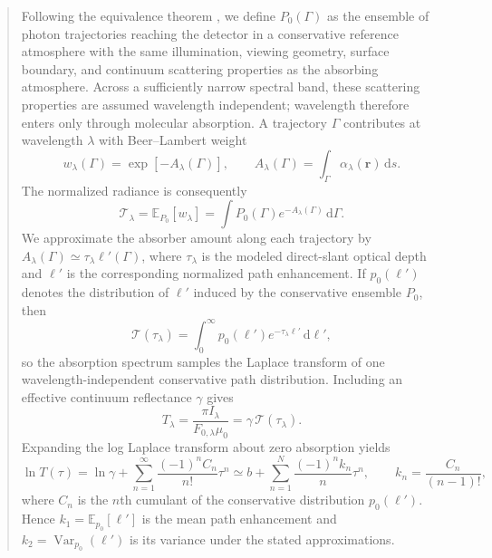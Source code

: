 \documentclass[11pt]{article}
\newcommand{\dd}{\,\mathrm{d}}
\newcommand{\E}{\mathbb{E}}
\newcommand{\Var}{\operatorname{Var}}
\newcommand{\lp}{\ell'}
\begin{document}
\begin{quote}
Following the equivalence theorem \citep{irvine1964,partain2000,stephens2000},
we define $P_0(\Gamma)$ as the ensemble of photon trajectories reaching the
detector in a conservative reference atmosphere with the same illumination,
viewing geometry, surface boundary, and continuum scattering properties as the
absorbing atmosphere.  Across a sufficiently narrow spectral band, these
scattering properties are assumed wavelength independent; wavelength therefore
enters only through molecular absorption.  A trajectory $\Gamma$ contributes
at wavelength $\lambda$ with Beer--Lambert weight
\begin{equation}
  w_\lambda(\Gamma)
  = \exp[-A_\lambda(\Gamma)],
  \qquad
  A_\lambda(\Gamma)
  = \int_\Gamma \alpha_\lambda(\bm r)\dd s.
  \label{eq:ms_weight}
\end{equation}
The normalized radiance is consequently
\begin{equation}
  \mathcal T_\lambda
  = \E_{P_0}[w_\lambda]
  = \int P_0(\Gamma)e^{-A_\lambda(\Gamma)}\dd\Gamma.
  \label{eq:ms_equivalence}
\end{equation}
We approximate the absorber amount along each trajectory by
$A_\lambda(\Gamma)\simeq\tau_\lambda\lp(\Gamma)$, where $\tau_\lambda$ is the
modeled direct-slant optical depth and $\lp$ is the corresponding normalized
path enhancement.  If $p_0(\lp)$ denotes the distribution of $\lp$ induced by
the conservative ensemble $P_0$, then
\begin{equation}
  \mathcal T(\tau_\lambda)
  = \int_0^\infty p_0(\lp)e^{-\tau_\lambda\lp}\dd\lp,
  \label{eq:ms_laplace}
\end{equation}
so the absorption spectrum samples the Laplace transform of one
wavelength-independent conservative path distribution.  Including an
effective continuum reflectance $\gamma$ gives
\begin{equation}
  T_\lambda
  = \frac{\pi I_\lambda}{F_{0,\lambda}\mu_0}
  = \gamma\,\mathcal T(\tau_\lambda).
  \label{eq:ms_measured}
\end{equation}
Expanding the log Laplace transform about zero absorption yields
\begin{equation}
  \ln T(\tau)
  = \ln\gamma
    +\sum_{n=1}^{\infty}\frac{(-1)^n C_n}{n!}\tau^n
  \simeq b+\sum_{n=1}^{N}\frac{(-1)^n k_n}{n}\tau^n,
  \qquad
  k_n=\frac{C_n}{(n-1)!},
  \label{eq:ms_fit}
\end{equation}
where $C_n$ is the $n$th cumulant of the conservative distribution
$p_0(\lp)$.  Hence $k_1=\E_{p_0}[\lp]$ is the mean path enhancement and
$k_2=\Var_{p_0}(\lp)$ is its variance under the stated approximations.
\end{quote}
\end{document}
